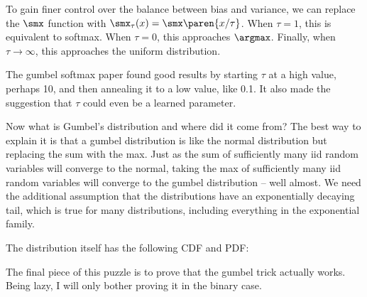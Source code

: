 \documentclass[12pt]{article}
\begin{document}
To gain finer control over the balance between bias and variance, we can replace the $\smx$ function with $\smx_\tau(x) = \smx\paren{x/\tau}$. When $\tau = 1$, this is equivalent to softmax. When $\tau = 0$, this approaches $\argmax$. Finally, when $\tau \rightarrow \infty$, this approaches the uniform distribution.

The gumbel softmax paper found good results by starting $\tau$ at a high value, perhaps 10, and then annealing it to a low value, like 0.1. It also made the suggestion that $\tau$ could even be a learned parameter. 

Now what is Gumbel's distribution and where did it come from? The best way to explain it is that a gumbel distribution is like the normal distribution but replacing the sum with the max. Just as the sum of sufficiently many iid random variables will converge to the normal, taking the max of sufficiently many iid random variables will converge to the gumbel distribution -- well almost. We need the additional assumption that the distributions have an exponentially decaying tail, which is true for many distributions, including everything in the exponential family.

The distribution itself has the following CDF and PDF:


The final piece of this puzzle is to prove that the gumbel trick actually works. Being lazy, I will only bother proving it in the binary case. 

\end{document}
